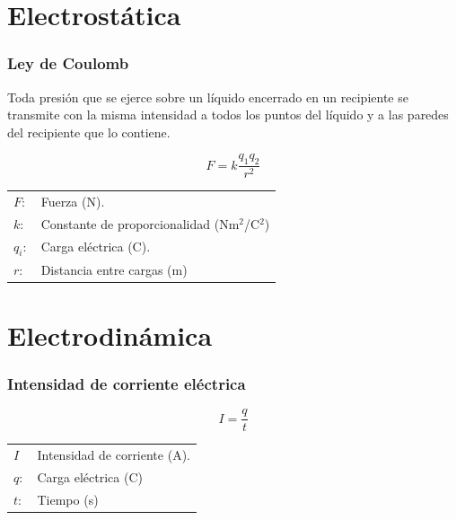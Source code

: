 \documentclass[handout]{beamer}
\begin{document}

  

  

\section{Electrostática}


\begin{frame}
  \frametitle{Ley de Coulomb}
  \begin{block}{}
    Toda presión que se ejerce sobre un líquido encerrado en un recipiente se transmite
    con la misma intensidad a todos los puntos del líquido y a las paredes del recipiente
    que lo contiene.
  \end{block}
  
  {\huge \[F = k  \frac{q_1 q_2}{r^2}\]}
  
  \begin{tabular}{ll}
    $F:$ & Fuerza (N).  \\ 
    $k:$ & Constante de proporcionalidad (Nm$^2$/C$^2$) \\ 
    $q_i:$ & Carga eléctrica (C). \\
    $r:$ & Distancia entre cargas (m) \\
  \end{tabular}
  
\end{frame}

\section{Electrodinámica}

\begin{frame}
  \frametitle{Intensidad de corriente eléctrica}
  
  {\huge \[I =\frac{q}{t}\]}
  
  \begin{tabular}{ll}
    $I$ & Intensidad de corriente (A).  \\ 
    $q:$ & Carga eléctrica (C) \\ 
    $t:$ & Tiempo (s) \\

  \end{tabular}
  
\end{frame}
\end{document}
